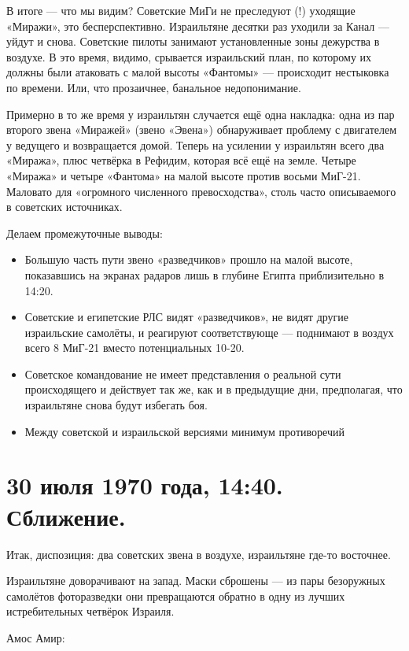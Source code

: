 В итоге — что мы видим? Советские МиГи не преследуют (!) уходящие «Миражи», это бесперспективно. Израильтяне десятки раз уходили за Канал — уйдут и снова. Советские пилоты занимают установленные зоны дежурства в воздухе. В это время, видимо, срывается израильский план, по которому их должны были атаковать с малой высоты «Фантомы» — происходит нестыковка по времени. Или, что прозаичнее, банальное недопонимание.

Примерно в то же время у израильтян случается ещё одна накладка: одна из пар второго звена «Миражей» (звено «Эвена») обнаруживает проблему с двигателем у ведущего и возвращается домой. Теперь на усилении у израильтян всего два «Миража», плюс четвёрка в Рефидим, которая всё ещё на земле. Четыре «Миража» и четыре «Фантома» на малой высоте против восьми МиГ-21. Маловато для «огромного численного превосходства», столь часто описываемого в советских источниках.

Делаем промежуточные выводы:

\begin{itemize}
	\item Большую часть пути звено «разведчиков» прошло на малой высоте, показавшись на экранах радаров лишь в глубине Египта приблизительно в 14:20.
	\item Советские и египетские РЛС видят «разведчиков», не видят другие израильские самолёты, и реагируют соответствующе — поднимают в воздух всего 8 МиГ-21 вместо потенциальных 10-20.
	\item Советское командование не имеет представления о реальной сути происходящего и действует так же, как и в предыдущие дни, предполагая, что израильтяне снова будут избегать боя.
	\item Между советской и израильской версиями минимум противоречий
\end{itemize}



\section{30 июля 1970 года, 14:40. Сближение.}

Итак, диспозиция: два советских звена в воздухе, израильтяне где-то восточнее.

Израильтяне доворачивают на запад. Маски сброшены — из пары безоружных самолётов фоторазведки они превращаются обратно в одну из лучших истребительных четвёрок Израиля.

Амос Амир:

